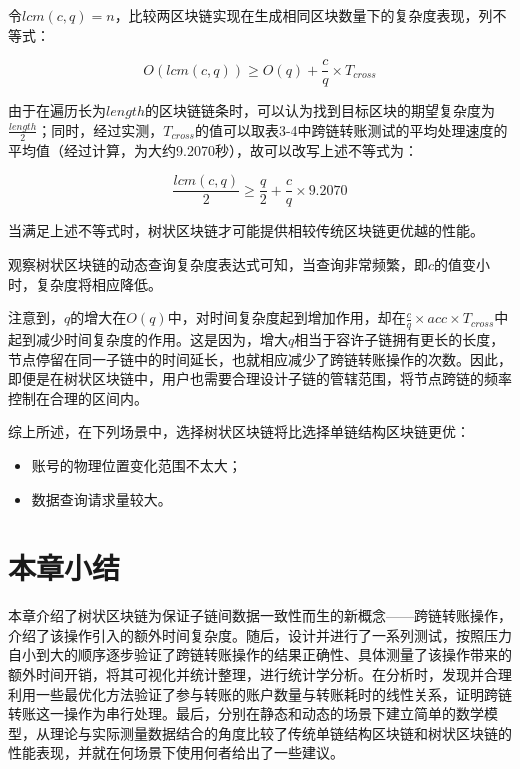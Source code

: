 令$lcm(c, q) = n$，比较两区块链实现在生成相同区块数量下的复杂度表现，列不等式：

$$
    O(lcm(c, q)) \geq O(q) + \frac{c}{q} \times T_{cross}
$$

由于在遍历长为$length$的区块链链条时，可以认为找到目标区块的期望复杂度为$\frac{length}{2}$；同时，经过实测，$T_{cross}$的值可以取表3-4中跨链转账测试的平均处理速度的平均值（经过计算，为大约9.2070秒），故可以改写上述不等式为：

$$
    \frac{lcm(c, q)}{2} \geq \frac{q}{2} + \frac{c}{q} \times 9.2070
$$

当满足上述不等式时，树状区块链才可能提供相较传统区块链更优越的性能。

观察树状区块链的动态查询复杂度表达式可知，当查询非常频繁，即$c$的值变小时，复杂度将相应降低。

注意到，$q$的增大在$O(q)$中，对时间复杂度起到增加作用，却在$\frac{c}{q} \times acc \times T_{cross}$中起到减少时间复杂度的作用。这是因为，增大$q$相当于容许子链拥有更长的长度，节点停留在同一子链中的时间延长，也就相应减少了跨链转账操作的次数。因此，即便是在树状区块链中，用户也需要合理设计子链的管辖范围，将节点跨链的频率控制在合理的区间内。

综上所述，在下列场景中，选择树状区块链将比选择单链结构区块链更优：

\begin{itemize}
    \item 账号的物理位置变化范围不太大；
    \item 数据查询请求量较大。
\end{itemize}

\section{本章小结}

本章介绍了树状区块链为保证子链间数据一致性而生的新概念——跨链转账操作，介绍了该操作引入的额外时间复杂度。随后，设计并进行了一系列测试，按照压力自小到大的顺序逐步验证了跨链转账操作的结果正确性、具体测量了该操作带来的额外时间开销，将其可视化并统计整理，进行统计学分析。在分析时，发现并合理利用一些最优化方法验证了参与转账的账户数量与转账耗时的线性关系，证明跨链转账这一操作为串行处理。最后，分别在静态和动态的场景下建立简单的数学模型，从理论与实际测量数据结合的角度比较了传统单链结构区块链和树状区块链的性能表现，并就在何场景下使用何者给出了一些建议。
